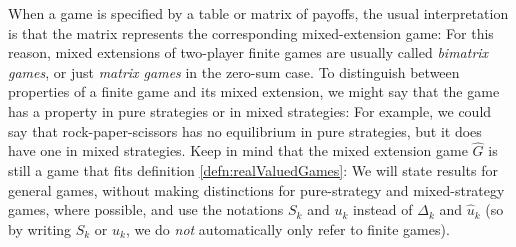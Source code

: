 \documentclass[a4paper]{scrreprt}
\begin{document}
    When a game is specified by a table or matrix of payoffs, the usual interpretation is that the matrix represents the corresponding mixed-extension game:
    For this reason, mixed extensions of two-player finite %
    games are usually called \emph{bimatrix games}, or just \emph{matrix games} in the zero-sum case.
    To distinguish between properties of a finite game and its mixed extension, we might say that the game has a property in pure strategies or in mixed strategies:
    For example, we could say that rock-paper-scissors has no equilibrium in pure strategies, but it does have one in mixed strategies.
    Keep in mind that the mixed extension game $\hat{G}$ is still a game that fits definition \ref{defn:realValuedGames}:
    We will state results for general games, without making distinctions for pure-strategy and mixed-strategy games, where possible, and use the notations $S_k$ and $u_k$ instead of $\Delta_k$ and $\hat{u}_k$ (so by writing $S_k$ or $u_k$, we do \emph{not} automatically only refer to finite games).
    
\end{document}
